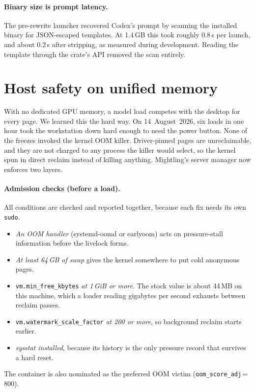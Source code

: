 \documentclass[11pt]{article}
\newcommand{\code}[1]{\texttt{#1}}
\begin{document}
\paragraph{Binary size is prompt latency.} The pre-rewrite launcher recovered Codex's prompt by
scanning the installed binary for JSON-escaped templates. At 1.4\,GB this took roughly 0.8\,s
per launch, and about 0.2\,s after stripping, as measured during development. Reading the template through the crate's API removed the scan
entirely.

\section{Host safety on unified memory}
\label{sec:safety}

With no dedicated GPU memory, a model load competes with the desktop for every page. We learned
this the hard way. On 14~August~2026, six loads in one hour took the workstation down hard enough to
need the power button. None of the freezes invoked the kernel OOM killer. Driver-pinned pages are
unreclaimable, and they are not charged to any process the killer would select, so the kernel spun
in direct reclaim instead of killing anything. Mightling's server manager now enforces two layers.

\paragraph{Admission checks (before a load).} All conditions are checked and reported together,
because each fix needs its own \code{sudo}.
\begin{itemize}
  \item \emph{An OOM handler} (systemd-oomd or earlyoom) acts on pressure-stall information
    \cite{linuxpsi} before the livelock forms.
  \item \emph{At least 64\,GB of swap} gives the kernel somewhere to put cold anonymous pages.
  \item \code{vm.min\_free\_kbytes} \emph{at 1\,GiB or more}. The stock value is about 44\,MB on
    this machine, which a loader reading gigabytes per second exhausts between reclaim passes.
  \item \code{vm.watermark\_scale\_factor} \emph{at 200 or more}, so background reclaim starts
    earlier.
  \item \emph{sysstat installed}, because its history is the only pressure record that survives a
    hard reset.
\end{itemize}
The container is also nominated as the preferred OOM victim (\code{oom\_score\_adj}\,=\,800).
\end{document}
